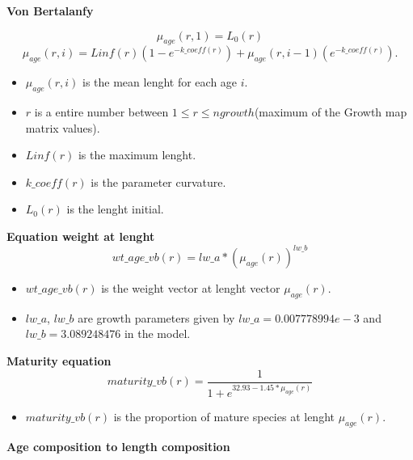 \documentclass{article}
\begin{document}






\textbf{Von Bertalanfy}

\begin{equation}
    \mu_{age}(r,1)=L_0(r)
\end{equation}
\begin{equation}
    \mu_{age}(r,i)=Linf(r)(1-e^{-{k\_coeff(r)}})+\mu_{age}(r,i-1)(e^{-k\_{coeff(r)}}).
\end{equation}
 \begin{itemize}
    \item $\mu_{age}(r,i)$ is the mean lenght for each age $i$.
     \item $r$ is a entire number between $1\leq r \leq ngrowth$(maximum of the Growth map matrix values). 
     \item $Linf(r)$ is the maximum lenght.
     \item $k\_coeff(r)$ is the parameter curvature.
     \item $L_0(r)$ is the lenght initial.
     
 \end{itemize}
\textbf{Equation weight at lenght}\\
\begin{equation}
     wt\_age\_vb(r) = lw\_a * \left(\mu_{age}(r)\right)^{lw\_b}
 \end{equation}
 \begin{itemize}
     \item $wt\_age\_vb(r)$ is the weight vector at lenght vector $\mu_{age}(r)$.
     \item $lw\_a$, $lw\_b$ are growth parameters given by  $lw\_a=0.007778994e-3$ and $lw\_b=3.089248476$ in the model.
 \end{itemize}
 \textbf{Maturity equation}\\
 \begin{equation}
    maturity\_vb(r) = \dfrac{1}{1+e^{32.93-1.45*\mu_{age}(r)}}
\end{equation}
\begin{itemize}
    \item $maturity\_vb(r)$ is the proportion of mature species at lenght $\mu_{age}(r)$.
\end{itemize}
\textbf{Age composition to length composition}\\
\end{document}
